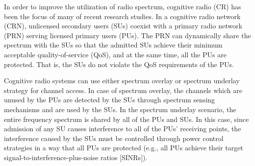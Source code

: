 \documentclass[journal,twoside]{IEEEtran}
\begin{document}
	In order to improve the utilization of radio spectrum, cognitive radio (CR) has been the focus of many of recent research studies. In a cognitive radio network (CRN), unlicensed secondary users (SUs) coexist with a primary radio network (PRN) serving licensed primary users (PUs). The PRN can dynamically share the spectrum with the  SUs so that the admitted SUs achieve their minimum acceptable quality-of-service (QoS), and at the same time, all the PUs are protected. That is, the  SUs do not violate the QoS requirements of the PUs.
	
	Cognitive radio systems can use either spectrum overlay or spectrum underlay strategy for channel access. In case of spectrum overlay, the channels which are unused by the PUs are detected by the SUs through spectrum sensing mechanisms and are used by the SUs. In the spectrum underlay scenario,  the entire frequency spectrum is shared by all of the PUs and SUs. In this case, since admission of any  SU causes interference to all of the PUs' receiving points, the interference caused by the SUs must be controlled through power control strategies in a way that all PUs are protected (e.g., all PUs achieve their target signal-to-interference-plus-noise ratios [SINRs]).
\end{document}
